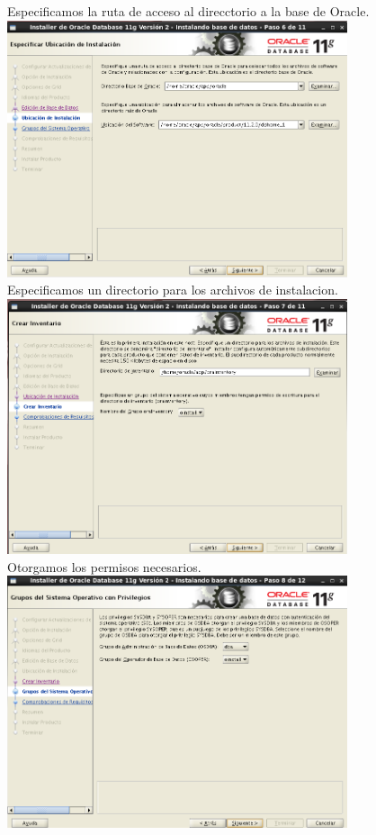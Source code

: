 \documentclass[12pt,letterpaper]{article}
\begin{document}
\begin{center}
Especificamos la ruta de acceso al direcctorio a la base de Oracle.\\
\includegraphics[width=10cm]{./oraclelinux/17.png}\\
Especificamos un directorio para los archivos de instalacion.\\
\includegraphics[width=10cm]{./oraclelinux/18.png}\\
Otorgamos los permisos necesarios.\\
\includegraphics[width=10cm]{./oraclelinux/19.png}\\

\end{center}
\end{document}
